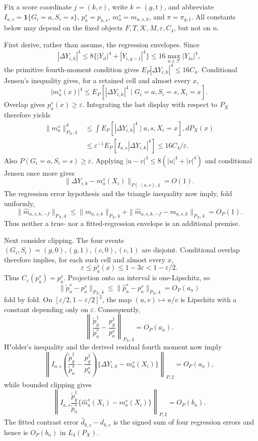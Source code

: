 Fix a score coordinate \(j=(k,c)\), write \(k=(g,t)\), and abbreviate \(I_{a,s}=\mathbf 1\{G_i=a,S_i=s\}\), \(p_a^s=p_{a,s}\), \(m_a^s=m_{a,s,k}\), and \(\pi=\pi_{g,1}\). All constants below may depend on the fixed objects \(F,T,\mathcal K,M,\varepsilon,C_4\), but not on \(n\).

First derive, rather than assume, the regression envelopes. Since
\[
 |\Delta Y_{i,k}|^4
 \le 8\{|Y_{it}|^4+|Y_{i,g-1}|^4\}
 \le16\max_{u\in\mathcal T}|Y_{iu}|^4,
\]
the primitive fourth-moment condition gives \(E_P|\Delta Y_{i,k}|^4\le16C_4\). Conditional Jensen's inequality gives, for a retained cell and almost every \(x\),
\[
 |m_a^s(x)|^4
 \le E_P[|\Delta Y_{i,k}|^4\mid G_i=a,S_i=s,X_i=x].
\]
Overlap gives \(p_a^s(x)\ge\varepsilon\). Integrating the last display with respect to \(P_X\) therefore yields
\[
\begin{aligned}
 \|m_a^s\|_{P_X,4}^4
 &\le \int E_P[|\Delta Y_{i,k}|^4\mid a,s,X_i=x],dP_X(x)\\
 &\le \varepsilon^{-1}E_P[I_{a,s}|\Delta Y_{i,k}|^4]
 \le16C_4/\varepsilon.
\end{aligned}
\]
Also \(P(G_i=a,S_i=s)\ge\varepsilon\). Applying \(|u-v|^4\le8(|u|^4+|v|^4)\) and conditional Jensen once more gives
\[
 \|\Delta Y_{i,k}-m_a^s(X_i)\|_{P(\cdot\mid a,s),4}=O(1).
\]
The regression error hypothesis and the triangle inequality now imply, fold uniformly,
\[
 \|\widehat m_{a,s,k,-f}\|_{P_X,4}
 \le \|m_{a,s,k}\|_{P_X,4}
     +\|\widehat m_{a,s,k,-f}-m_{a,s,k}\|_{P_X,4}
 =O_P(1).
\]
Thus neither a true- nor a fitted-regression envelope is an additional premise.

Next consider clipping. The four events \((G_i,S_i)=(g,0),(g,1),(c,0),(c,1)\) are disjoint. Conditional overlap therefore implies, for each such cell and almost every \(x\),
\[
 \varepsilon\le p_a^s(x)\le1-3\varepsilon
 <1-\varepsilon/2.
\]
Thus \(C_\varepsilon(p_a^s)=p_a^s\). Projection onto an interval is one-Lipschitz, so
\[
 \|\widetilde p_a^s-p_a^s\|_{P_X,4}
 \le\|\widehat p_a^s-p_a^s\|_{P_X,4}=O_P(a_n)
\]
fold by fold. On \([\varepsilon/2,1-\varepsilon/2]^2\), the map \((u,v)\mapsto u/v\) is Lipschitz with a constant depending only on \(\varepsilon\). Consequently,
\[
 \left\|\frac{\widetilde p_g^1}{\widetilde p_a^s}
       -\frac{p_g^1}{p_a^s}\right\|_{P_X,4}=O_P(a_n).
\]
H"older's inequality and the derived residual fourth moment now imply
\[
 \left\|I_{a,s}\left(
 \frac{\widetilde p_g^1}{\widetilde p_a^s}
 -\frac{p_g^1}{p_a^s}\right)
 \{\Delta Y_{i,k}-m_a^s(X_i)\}\right\|_{P,2}=O_P(a_n),
\]
while bounded clipping gives
\[
 \left\|I_{a,s}\frac{\widetilde p_g^1}{\widetilde p_a^s}
 \{\widehat m_a^s(X_i)-m_a^s(X_i)\}\right\|_{P,2}=O_P(b_n).
\]
The fitted contrast error \(\widehat d_{k,c}-d_{k,c}\) is the signed sum of four regression errors and hence is \(O_P(b_n)\) in \(L_4(P_X)\).

